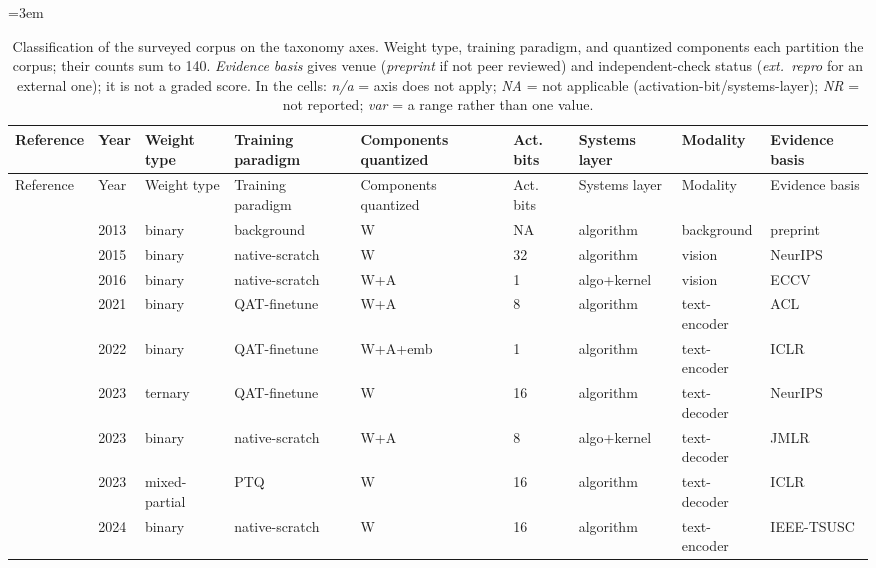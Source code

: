 \documentclass[11pt]{article}
\begin{document}
\begin{landscape}
\begingroup\footnotesize\setlength{\tabcolsep}{4pt} \hfuzz=2pt \emergencystretch=3em
\begin{longtable}{p{3.2cm} p{1cm} p{1.9cm} p{2.2cm} p{2.2cm} p{1.3cm} p{2.2cm} p{2.1cm} p{2.5cm}}
\caption{Classification of the surveyed corpus on the taxonomy axes. Weight type, training paradigm, and quantized components each partition the corpus; their counts sum to 140. \emph{Evidence basis} gives venue (\emph{preprint} if not peer reviewed) and independent-check status (\emph{ext.\ repro} for an external one); it is not a graded score. In the cells: \emph{n/a} = axis does not apply; \emph{NA} = not applicable (activation-bit/systems-layer); \emph{NR} = not reported; \emph{var} = a range rather than one value.}\label{tab:classification}\\
\toprule Reference & Year & Weight type & Training paradigm & Components quantized & Act. bits & Systems layer & Modality & Evidence basis \\ \midrule \endfirsthead
\toprule Reference & Year & Weight type & Training paradigm & Components quantized & Act. bits & Systems layer & Modality & Evidence basis \\ \midrule \endhead
\bottomrule \endfoot
\citet{Bengio2013-STE} & 2013 & binary & background & W & NA & algorithm & background & preprint \\
\citet{Courbariaux2015-BinaryConnect} & 2015 & binary & native-scratch & W & 32 & algorithm & vision & Neur\allowbreak{}IPS \\
\citet{Rastegari2016-XNORNet} & 2016 & binary & native-scratch & W+\allowbreak{}A & 1 & algo+\allowbreak{}kernel & vision & ECCV \\
\citet{Bai2021-BinaryBERT} & 2021 & binary & QAT-finetune & W+\allowbreak{}A & 8 & algorithm & text-encoder & ACL \\
\citet{Qin2022-BiBERT} & 2022 & binary & QAT-finetune & W+\allowbreak{}A+\allowbreak{}emb & 1 & algorithm & text-encoder & ICLR \\
\citet{Kim2023-TSLD} & 2023 & ternary & QAT-finetune & W & 16 & algorithm & text-decoder & Neur\allowbreak{}IPS \\
\citet{Wang2023-BitNet} & 2023 & binary & native-scratch & W+\allowbreak{}A & 8 & algo+\allowbreak{}kernel & text-decoder & JMLR \\
\citet{Shang2023-PBLLM} & 2023 & mixed-partial & PTQ & W & 16 & algorithm & text-decoder & ICLR \\
\citet{Ansar2024-BEExformer} & 2024 & binary & native-scratch & W & 16 & algorithm & text-encoder & IEEE-TSUSC \\

\end{longtable}
\end{landscape}
\end{document}
